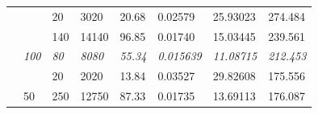 \documentclass[a4paper, 11pt]{report}
\begin{document}
\begin{table}[ht]
\begin{tabular}{|l|l|l|l|l|l|l|l|}
        \cline{3-8}
                                                                                &                                                                                 & 20                                                                     & 3020                                                                       & 20.68                                                                                            & 0.02579          & 25.93023          & 274.484                                                                       \\ 
        \cline{2-8}
                                                                                & \multirow{3}{*}{\textit{100 }}                                                  & 140                                                                    & 14140                                                                      & 96.85                                                                                            & 0.01740          & 15.03445          & 239.561                                                                       \\ 
        \cline{3-8}
                                                                                &                                                                                 & \textit{80}                                                            & \textit{8080}                                                              & \textit{55.34}                                                                                   & \textit{0.015639} & \textit{11.08715} & \textit{212.453}                                                              \\ 
        \cline{3-8}
                                                                                &                                                                                 & 20                                                                     & 2020                                                                       & 13.84                                                                                            & 0.03527          & 29.82608          & 175.556                                                                       \\ 
        \cline{2-8}
                                                                                & \multirow{3}{*}{50}                                                             & 250                                                                    & 12750                                                                      & 87.33                                                                                            & 0.01735          & 13.69113          & 176.087                                                                       \\ 

\end{tabular}
\end{table}
\end{document}
